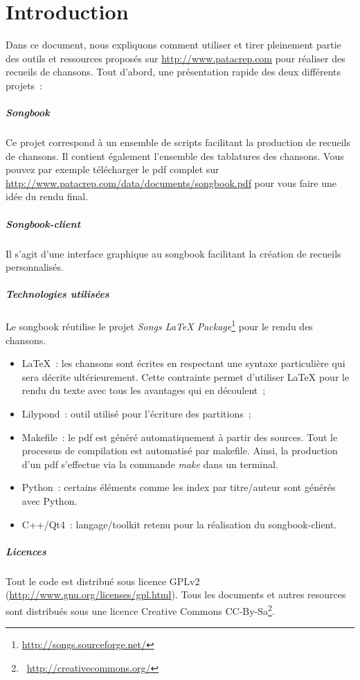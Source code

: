 \chapter*{Introduction}
\minitoc
\label{chap:introduction}

Dans ce document, nous expliquons comment utiliser et tirer pleinement
partie des outils et ressources proposés sur \url{http://www.patacrep.com} pour
réaliser des recueils de chansons. Tout d'abord, une présentation
rapide des deux différents projets~:

\paragraph{Songbook}
Ce projet correspond à un ensemble de scripts facilitant la production
de recueils de chansons. Il contient également l'ensemble des
tablatures des chansons. Vous pouvez par exemple télécharger le pdf
complet sur \url{http://www.patacrep.com/data/documents/songbook.pdf}
pour vous faire une idée du rendu final.

\paragraph{Songbook-client} 
Il s'agit d'une interface graphique au songbook facilitant la création
de recueils personnalisés.

\paragraph{Technologies utilisées} 
Le songbook réutilise le projet \emph{Songs LaTeX
  Package}\footnote{\url{http://songs.sourceforge.net/}} pour le rendu
des chansons.

\begin{itemize}
\item \LaTeX~: les chansons sont écrites en respectant une syntaxe
  particulière qui sera décrite ultérieurement. Cette contrainte
  permet d'utiliser \LaTeX{} pour le rendu du texte avec tous les
  avantages qui en découlent~;
\item Lilypond~: outil utilisé pour l'écriture des partitions~;
\item Makefile~: le pdf est généré automatiquement à partir des sources. Tout le processus
  de compilation est automatisé par makefile. Ainsi, la production d'un pdf s'effectue
  via la commande \emph{make} dans un terminal.
\item Python~: certains éléments comme les index par titre/auteur
  sont générés avec Python.
\item C++/Qt4~: langage/toolkit retenu pour la réalisation du songbook-client.
\end{itemize}

\paragraph{Licences}
Tout le code est distribué sous licence GPLv2
(\url{http://www.gnu.org/licenses/gpl.html}). Tous les documents et
autres resources sont distribués sous une licence Creative Commons
CC-By-Sa\footnote{\bysa~\url{http://creativecommons.org/}}.
